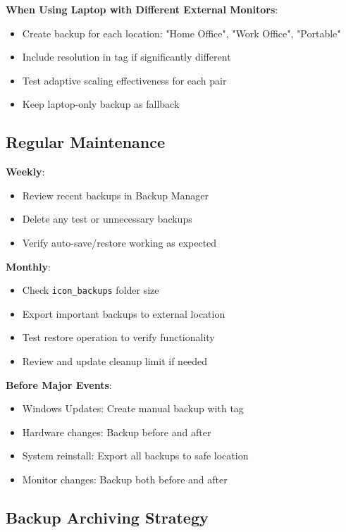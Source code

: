 \documentclass[a4paper,11pt]{article}
\begin{document}
\textbf{When Using Laptop with Different External Monitors}:
\begin{itemize}
  \item Create backup for each location: "Home Office", "Work
    Office", "Portable"
  \item Include resolution in tag if significantly different
  \item Test adaptive scaling effectiveness for each pair
  \item Keep laptop-only backup as fallback
\end{itemize}

\subsection{Regular Maintenance}

\textbf{Weekly}:
\begin{itemize}
  \item Review recent backups in Backup Manager
  \item Delete any test or unnecessary backups
  \item Verify auto-save/restore working as expected
\end{itemize}

\textbf{Monthly}:
\begin{itemize}
  \item Check \texttt{icon\_backups} folder size
  \item Export important backups to external location
  \item Test restore operation to verify functionality
  \item Review and update cleanup limit if needed
\end{itemize}

\textbf{Before Major Events}:
\begin{itemize}
  \item Windows Updates: Create manual backup with tag
  \item Hardware changes: Backup before and after
  \item System reinstall: Export all backups to safe location
  \item Monitor changes: Backup both before and after
\end{itemize}

\subsection{Backup Archiving Strategy}
\end{document}
